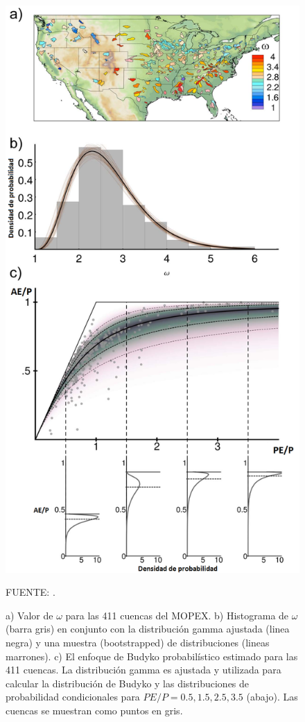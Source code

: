 \begin{figure}[ht]
\centering
	\includegraphics[scale=0.3]{Images/Greve03.png}
	\caption{a) Valor de $\omega$ para las 411 cuencas del MOPEX. b) Histograma de $\omega$ (barra gris) en conjunto con la distribución gamma ajustada (linea negra) y una muestra (bootstrapped) de distribuciones (lineas marrones). c) El enfoque de Budyko probabilístico estimado para las 411 cuencas. La distribución gamma es ajustada y utilizada para calcular la distribución de Budyko y las distribuciones de probabilidad condicionales para $PE/P = 0.5, 1.5, 2.5, 3.5$ (abajo). Las cuencas se muestran como puntos en gris.}
	{\raggedright FUENTE: \citet{Greve2015}. \par}
	\label{fig:Greve03}
\end{figure}